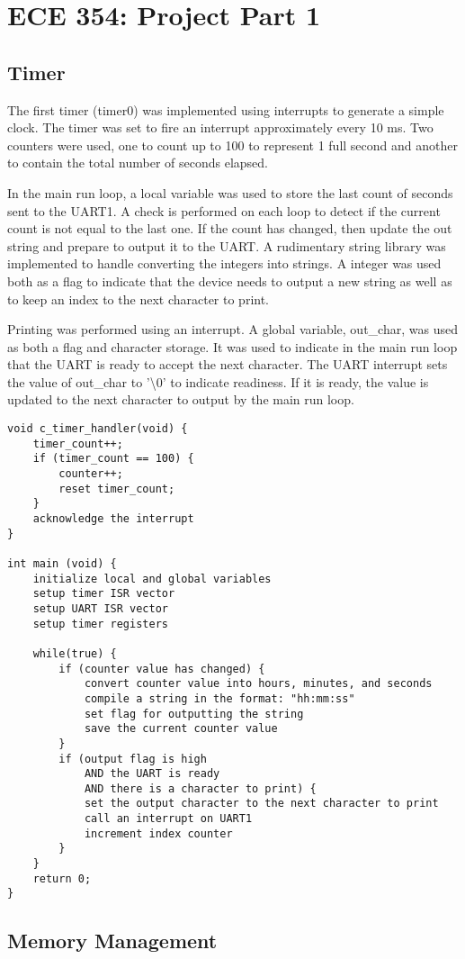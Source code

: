 \documentclass[oneside]{article}
\begin{document}
\lstset{language=C}
\section*{ECE 354: Project Part 1}
\subsection*{Timer}
The first timer (timer0) was implemented using interrupts to generate a simple
clock. The timer was set to fire an interrupt approximately every 10 ms. Two
counters were used, one to count up to 100 to represent 1 full second and
another to contain the total number of seconds elapsed.

In the main run loop, a local variable was used to store the last count of
seconds sent to the UART1. A check is performed on each loop to detect if the
current count is not equal to the last one. If the count has changed, then
update the out string and prepare to output it to the UART. A rudimentary
string library was implemented to handle converting the integers into strings.
A integer was used both as a flag to indicate that the device needs
to output a new string as well as to keep an index to the next character to
print. 

Printing was performed using an interrupt. A global variable, out\_char, was
used as both a flag and character storage. It was used to indicate in the main
run loop that the UART is ready to accept the next character. The UART
interrupt sets the value of out\_char to '\textbackslash{}0' to indicate 
readiness. If it is ready, the value is updated to the next character to output
by the main run loop.

\begin{lstlisting} 
void c_timer_handler(void) {
    timer_count++;
    if (timer_count == 100) {
        counter++;
        reset timer_count;
    }
    acknowledge the interrupt
}

int main (void) {
    initialize local and global variables
    setup timer ISR vector
    setup UART ISR vector
    setup timer registers

    while(true) {
        if (counter value has changed) {
            convert counter value into hours, minutes, and seconds
            compile a string in the format: "hh:mm:ss"
            set flag for outputting the string
            save the current counter value
        }
        if (output flag is high 
            AND the UART is ready 
            AND there is a character to print) {
            set the output character to the next character to print
            call an interrupt on UART1
            increment index counter
        }
    }
    return 0;
}
\end{lstlisting}

\subsection*{Memory Management}
\end{document}
